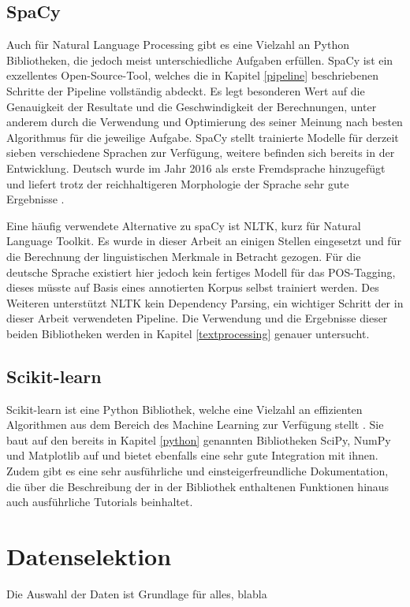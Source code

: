 \subsection{SpaCy}
Auch für Natural Language Processing gibt es eine Vielzahl an Python Bibliotheken, die jedoch meist unterschiedliche Aufgaben erfüllen. SpaCy ist ein exzellentes Open-Source-Tool, welches die in Kapitel \ref{pipeline} beschriebenen Schritte der Pipeline vollständig abdeckt. Es legt besonderen Wert auf die Genauigkeit der Resultate und die Geschwindigkeit der Berechnungen, unter anderem durch die Verwendung und Optimierung des seiner Meinung nach besten Algorithmus für die jeweilige Aufgabe. SpaCy stellt trainierte Modelle für derzeit sieben verschiedene Sprachen zur Verfügung, weitere befinden sich bereits in der Entwicklung. Deutsch wurde im Jahr 2016 als erste Fremdsprache hinzugefügt und liefert trotz der reichhaltigeren Morphologie der Sprache sehr gute Ergebnisse \cite{spacyGerman}.

Eine häufig verwendete Alternative zu spaCy ist NLTK, kurz für Natural Language Toolkit. Es wurde in dieser Arbeit an einigen Stellen eingesetzt und für die Berechnung der linguistischen Merkmale in Betracht gezogen. Für die deutsche Sprache existiert hier jedoch kein fertiges Modell für das POS-Tagging, dieses müsste auf Basis eines annotierten Korpus selbst trainiert werden. Des Weiteren unterstützt NLTK kein Dependency Parsing, ein wichtiger Schritt der in dieser Arbeit verwendeten Pipeline. Die Verwendung und die Ergebnisse dieser beiden Bibliotheken werden in Kapitel \ref{textprocessing} genauer untersucht.

\subsection{Scikit-learn}
Scikit-learn ist eine Python Bibliothek, welche eine Vielzahl an effizienten Algorithmen aus dem Bereich des Machine Learning zur Verfügung stellt \cite{scikit-learn}. Sie baut auf den bereits in Kapitel \ref{python} genannten Bibliotheken SciPy, NumPy und Matplotlib auf und bietet ebenfalls eine sehr gute Integration mit ihnen. Zudem gibt es eine sehr ausführliche und einsteigerfreundliche Dokumentation, die über die Beschreibung der in der Bibliothek enthaltenen Funktionen hinaus auch ausführliche Tutorials beinhaltet.

\section{Datenselektion}
Die Auswahl der Daten ist Grundlage für alles, blabla

